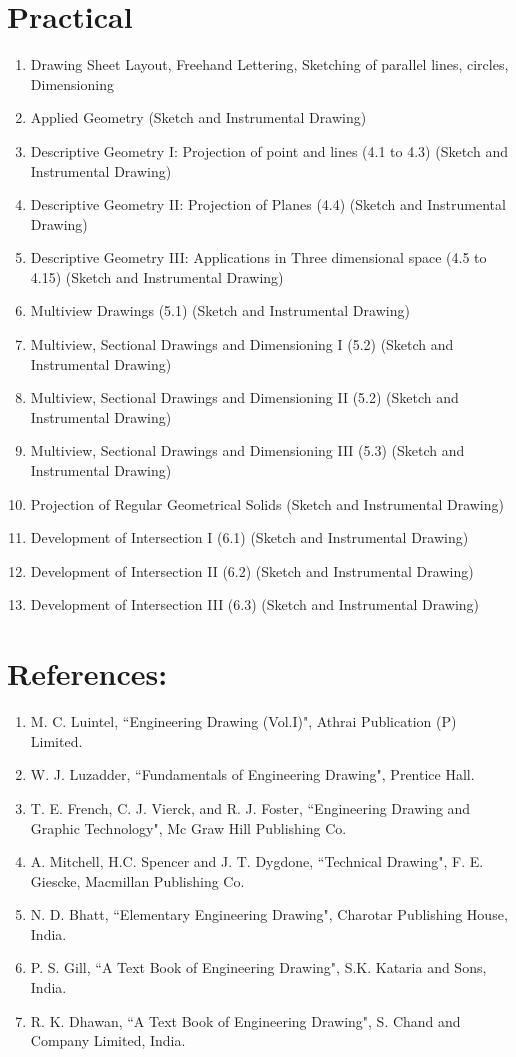 \section*{Practical}
\begin{enumerate}
    \item Drawing Sheet Layout, Freehand Lettering, Sketching of parallel lines, circles, Dimensioning
    \item Applied Geometry (Sketch and Instrumental Drawing)
    \item Descriptive Geometry I: Projection of point and lines (4.1 to 4.3) (Sketch and Instrumental Drawing)
    \item Descriptive Geometry II: Projection of Planes (4.4) (Sketch and Instrumental Drawing)
    \item Descriptive Geometry III: Applications in Three dimensional space (4.5 to 4.15) (Sketch and Instrumental Drawing)
    \item Multiview Drawings (5.1) (Sketch and Instrumental Drawing)
    \item Multiview, Sectional Drawings and Dimensioning I (5.2) (Sketch and Instrumental Drawing)
    \item Multiview, Sectional Drawings and Dimensioning II (5.2) (Sketch and Instrumental Drawing)
    \item Multiview, Sectional Drawings and Dimensioning III (5.3) (Sketch and Instrumental Drawing)
    \item Projection of Regular Geometrical Solids (Sketch and Instrumental Drawing)
    \item Development of Intersection I (6.1) (Sketch and Instrumental Drawing)
    \item Development of Intersection II (6.2) (Sketch and Instrumental Drawing)
    \item Development of Intersection III (6.3) (Sketch and Instrumental Drawing)
\end{enumerate}


\section*{References:}
\begin{enumerate}
    \item M. C. Luintel, ``Engineering Drawing (Vol.I)", Athrai Publication (P) Limited.
    \item W. J. Luzadder, ``Fundamentals of Engineering Drawing", Prentice Hall.
    \item T. E. French, C. J. Vierck, and R. J. Foster, ``Engineering Drawing and Graphic Technology", Mc Graw Hill Publishing Co.
    \item A. Mitchell, H.C. Spencer and J. T. Dygdone, ``Technical Drawing", F. E. Giescke, Macmillan Publishing Co.
    \item N. D. Bhatt, ``Elementary Engineering Drawing", Charotar Publishing House, India.
    \item P. S. Gill, ``A Text Book of Engineering Drawing", S.K. Kataria and Sons, India.
    \item R. K. Dhawan, ``A Text Book of Engineering Drawing", S. Chand and Company Limited, India.
\end{enumerate}